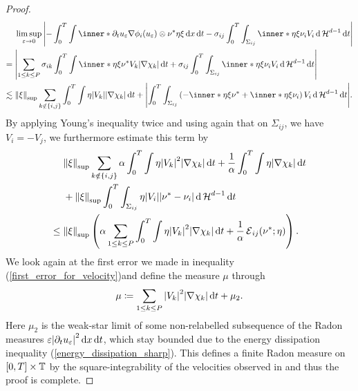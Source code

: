 \begin{proof}
	\begin{align*}
		& \limsup_{ \varepsilon \to 0 }
		\abs{
			- \int_{ 0 }^{ T }
			\int
			\inner*{ \partial_{ t } u_{ 
					\varepsilon } }{ \nabla \phi_{ i } ( u_{ 
					\varepsilon } ) 
				\otimes \nu^{ \ast } \eta \xi }
			\dd{ x }
			\dd{ t }
			-
			\sigma_{ i j }
			\int_{ 0 }^{ T }
			\int_{ \Sigma_{ i j } }
			\inner*{ \eta \xi }{ \nu_{ i } }
			V_{ i } 	
			\dd{ \hm^{ d - 1 } }
			\dd{ t }
		}
		\\
		={} &
		\abs{
			\sum_{ 1 \leq k \leq P }
			\sigma_{ i k }
			\int_{ 0 }^{ T }
			\int
			\inner*{ \eta \xi }{ \nu^{ \ast } }
			V_{ k }
			\abs{ \nabla \chi_{ k } }
			\dd{ t }
			+
			\sigma_{ i j }
			\int_{ 0 }^{ T }
			\int_{ \Sigma_{ i j } }
			\inner*{ \eta \xi }{ \nu_{ i } }
			V_{ i }
			\dd{ \hm^{ d - 1 } }
			\dd{ t }
		}
		\\
		\lesssim{} &
		\norm{ \xi }_{ \mathrm{sup} }
		\sum_{ k \notin \{ i , j \} }
		\int_{ 0 }^{ T }
		\int
		\eta
		\abs{ V_{ k } }
		\abs{ \nabla \chi_{ k } }
		\dd{ t }
		+
		\abs{
			\int_{ 0 }^{ T }
			\int_{ \Sigma_{ i j } }
			\left(
			-\inner*{ \eta \xi }{ \nu^{ \ast } }
			+
			\inner*{ \eta \xi }{ \nu_{ i } }
			\right)
			V_{ i }
			\dd{ \hm^{ d -1 } }
			\dd{ t }
		}.
	\end{align*}
	By applying Young's inequality twice and using again that on $ \Sigma_{ i j 
	} 
	$, we have $ V_{ 
		i } = - V_{ j } $, we furthermore estimate this term by
	\begin{align*}
		& \norm{ \xi }_{ \mathrm{sup} }
		\sum_{ k \notin \{ i , j \} }
		\alpha 
		\int_{ 0 }^{ T }
		\int
		\eta
		\abs{ V_{ k } }^{ 2 }
		\abs{ \nabla \chi_{ k } }
		\dd{ t }
		+
		\frac{ 1 }{ \alpha }
		\int_{ 0 }^{ T }
		\int
		\eta
		\abs{ \nabla \chi_{ k } }
		\dd{ t }
		\\
		&+
		\norm{ \xi }_{ \mathrm{sup} }
		\int_{ 0 }^{ T }
		\int_{ \Sigma_{ i j } }
		\eta
		\abs{ V_{ i } }
		\abs{ \nu^{ \ast } - \nu_{ i } }
		\dd{ \hm^{ d - 1 } }
		\dd{ t }
		\\
		\leq{} &
		\norm{ \xi }_{\mathrm{sup} }
		\left(
		\alpha
		\sum_{ 1 \leq k \leq P }
		\int_{ 0 }^{ T }
		\int
		\eta
		\abs{ V_{ k } }^{ 2 }
		\abs{ \nabla \chi_{ k } }
		\dd{ t}
		+
		\frac{ 1 }{ \alpha }
		\tilt_excess_{ i j } ( \nu^{ \ast } ; \eta )
		\right).
	\end{align*}
	We look again at the first error we made in inequality 
	(\ref{first_error_for_velocity})and define the measure $ \mu $ 
	through
	\begin{equation*}
		\mu
		\coloneqq
		\sum_{ 1 \leq k \leq P }
		\abs{ V_{ k } }^{ 2 }
		\abs{ \nabla \chi_{ k } }
		\dd{ t }
		+
		\mu_{ 2 }.
	\end{equation*}
	Here $ \mu_{ 2 } $ is the weak-star limit of some non-relabelled 
	subsequence of the Radon measures $ \varepsilon \abs{ \partial_{ t } u_{ 
			\varepsilon } }^{ 2 } \dd{ x } \dd{ t } $, which stay bounded due 
			to the 
	energy dissipation inequality (\ref{energy_dissipation_sharp}).
	This defines a finite Radon measure on $ [ 0 , T ] \times \operatorname{\mathbb{T}} $ by 
	the square-integrability of the velocities observed in 
	 and 
	thus the proof is complete.
\end{proof}

